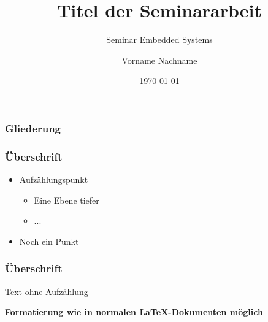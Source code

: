\documentclass{include/sikslides}
\title[Kurztitel]{Titel der Seminararbeit}
\subtitle{Seminar Embedded Systems} %
\author{Vorname Nachname}
\date[\today]{\today}
\begin{document}
\titleframe

\begin{frame}
    \frametitle{Gliederung}
    \tableofcontents[hideallsubsections]
\end{frame}


\begin{frame}
  \frametitle{Überschrift}
  \begin{itemize}
  \item Aufzählungspunkt
    \begin{itemize}
    \item Eine Ebene tiefer
    \item ...
    \end{itemize}
  \item Noch ein Punkt
  \end{itemize}
\end{frame}


\begin{frame}
    \frametitle{Überschrift}
    Text ohne Aufzählung
    \vfill
    \begin{center}
        \Large\textbf{Formatierung wie in normalen \LaTeX-Dokumenten möglich}
    \end{center}
\end{frame}
\end{document}
